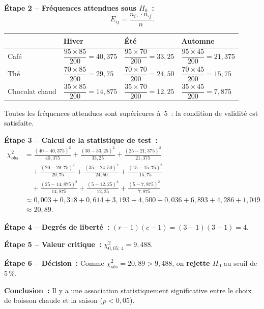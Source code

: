 \documentclass[11pt,french]{article}
\begin{document}
\textbf{Étape 2 -- Fréquences attendues sous $H_0$~:}
\[
  E_{ij} = \frac{n_{i\cdot} \cdot n_{\cdot j}}{n}.
\]

\begin{center}
\renewcommand{\arraystretch}{1.6}
\begin{tabular}{|P{3cm}|P{3.5cm}|P{3.5cm}|P{3.5cm}|}
\hline
{} & Hiver & Été & Automne \\
\hline
Café
  & $\dfrac{95 \times 85}{200} = 40{,}375$
  & $\dfrac{95 \times 70}{200} = 33{,}25$
  & $\dfrac{95 \times 45}{200} = 21{,}375$ \\[4pt]
\hline
Thé
  & $\dfrac{70 \times 85}{200} = 29{,}75$
  & $\dfrac{70 \times 70}{200} = 24{,}50$
  & $\dfrac{70 \times 45}{200} = 15{,}75$ \\[4pt]
\hline
Chocolat chaud
  & $\dfrac{35 \times 85}{200} = 14{,}875$
  & $\dfrac{35 \times 70}{200} = 12{,}25$
  & $\dfrac{35 \times 45}{200} = 7{,}875$ \\[4pt]
\hline
\end{tabular}
\end{center}

Toutes les fréquences attendues sont supérieures à~5~: la condition de validité est satisfaite.

\textbf{Étape 3 -- Calcul de la statistique de test~:}
\begin{align*}
  \chi^2_{obs}
  &= \frac{(40 - 40{,}375)^2}{40{,}375}
   + \frac{(30 - 33{,}25)^2}{33{,}25}
   + \frac{(25 - 21{,}375)^2}{21{,}375} \\[4pt]
  &\quad + \frac{(20 - 29{,}75)^2}{29{,}75}
   + \frac{(35 - 24{,}50)^2}{24{,}50}
   + \frac{(15 - 15{,}75)^2}{15{,}75} \\[4pt]
  &\quad + \frac{(25 - 14{,}875)^2}{14{,}875}
   + \frac{(5 - 12{,}25)^2}{12{,}25}
   + \frac{(5 - 7{,}875)^2}{7{,}875} \\[4pt]
  &\approx 0{,}003 + 0{,}318 + 0{,}614 + 3{,}193 + 4{,}500 + 0{,}036
           + 6{,}893 + 4{,}286 + 1{,}049 \\[4pt]
  &\approx 20{,}89.
\end{align*}

\textbf{Étape 4 -- Degrés de liberté~:} $(r-1)(c-1) = (3-1)(3-1) = 4$.

\textbf{Étape 5 -- Valeur critique~:} $\chi^2_{0{,}05;\,4} = 9{,}488$.

\textbf{Étape 6 -- Décision~:} Comme $\chi^2_{obs} = 20{,}89 > 9{,}488$, on \textbf{rejette
$H_0$} au seuil de $5\,\%$.

\textbf{Conclusion~:} Il y a une association statistiquement significative entre le choix de
boisson chaude et la saison ($p < 0{,}05$).
\end{document}
